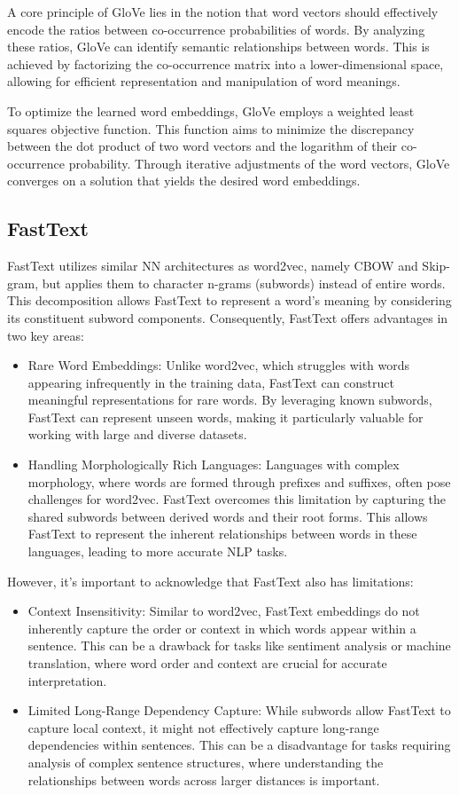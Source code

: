 A core principle of \ac{GloVe} lies in the notion that word vectors should effectively encode the ratios between co-occurrence probabilities of words.
By analyzing these ratios, \ac{GloVe} can identify semantic relationships between words.
This is achieved by factorizing the co-occurrence matrix into a lower-dimensional space, allowing for efficient representation and manipulation of word meanings.

To optimize the learned word embeddings, \ac{GloVe} employs a weighted least squares objective function.
This function aims to minimize the discrepancy between the dot product of two word vectors and the logarithm of their co-occurrence probability.
Through iterative adjustments of the word vectors, \ac{GloVe} converges on a solution that yields the desired word embeddings.

\subsection{FastText}
FastText \cite{fasttext} utilizes similar \ac{NN} architectures as word2vec, namely \ac{CBOW} and Skip-gram, but applies them to character n-grams (subwords) instead of entire words.
This decomposition allows FastText to represent a word's meaning by considering its constituent subword components.
Consequently, FastText offers advantages in two key areas:
\begin{itemize}
    \item Rare Word Embeddings: Unlike word2vec, which struggles with words appearing infrequently in the training data, FastText can construct meaningful representations for rare words. By leveraging known subwords, FastText can represent unseen words, making it particularly valuable for working with large and diverse datasets.    
    \item Handling Morphologically Rich Languages: Languages with complex morphology, where words are formed through prefixes and suffixes, often pose challenges for word2vec. FastText overcomes this limitation by capturing the shared subwords between derived words and their root forms. This allows FastText to represent the inherent relationships between words in these languages, leading to more accurate NLP tasks.
\end{itemize}
However, it's important to acknowledge that FastText also has limitations:
\begin{itemize}
    \item Context Insensitivity: Similar to word2vec, FastText embeddings do not inherently capture the order or context in which words appear within a sentence. This can be a drawback for tasks like sentiment analysis or machine translation, where word order and context are crucial for accurate interpretation.
    \item Limited Long-Range Dependency Capture: While subwords allow FastText to capture local context, it might not effectively capture long-range dependencies within sentences. This can be a disadvantage for tasks requiring analysis of complex sentence structures, where understanding the relationships between words across larger distances is important.    
\end{itemize}

